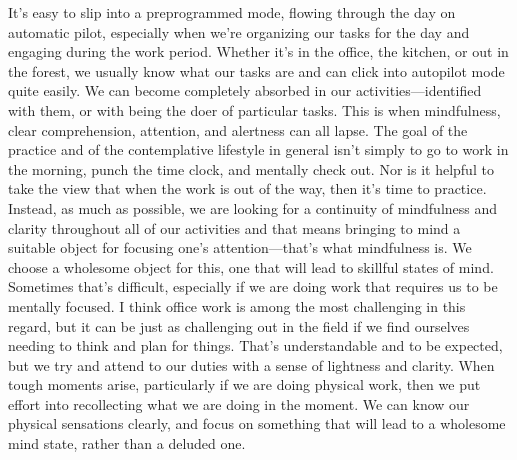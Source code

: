 
It's easy to slip into a preprogrammed mode, flowing through the day on 
automatic pilot, especially when we're organizing our tasks for the day 
and engaging during the work period. Whether it's in the office, the 
kitchen, or out in the forest, we usually know what our tasks are and 
can click into autopilot mode quite easily. We can become completely 
absorbed in our activities---identified with them, or with being the 
doer of particular tasks. This is when mindfulness, clear 
comprehension, attention, and alertness can all lapse. The goal of the 
practice and of the contemplative lifestyle in general isn't simply to 
go to work in the morning, punch the time clock, and mentally check 
out. Nor is it helpful to take the view that when the work is out of 
the way, then it's time to practice. Instead, as much as possible, we 
are looking for a continuity of mindfulness and clarity throughout all 
of our activities and that means bringing to mind a suitable object for 
focusing one's attention---that's what mindfulness is. We choose a 
wholesome object for this, one that will lead to skillful states of 
mind. Sometimes that's difficult, especially if we are doing work that 
requires us to be mentally focused. I think office work is among the 
most challenging in this regard, but it can be just as challenging out 
in the field if we find ourselves needing to think and plan for things. 
That's understandable and to be expected, but we try and attend to our 
duties with a sense of lightness and clarity. When tough moments arise, 
particularly if we are doing physical work, then we put effort into 
recollecting what we are doing in the moment. We can know our physical 
sensations clearly, and focus on something that will lead to a 
wholesome mind state, rather than a deluded one.

